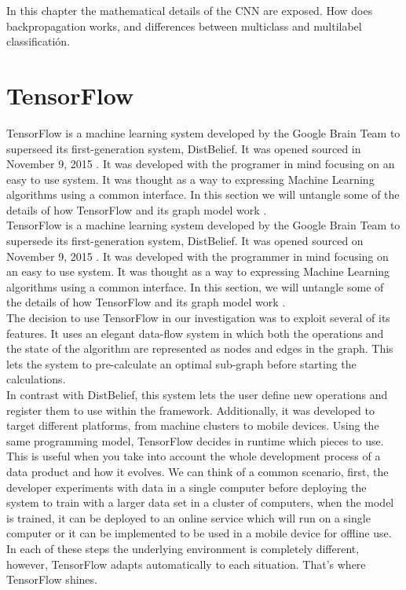 In this chapter the mathematical details of the CNN are exposed. How does backpropagation works, and differences between multiclass and multilabel classificatión.

\section{TensorFlow}

TensorFlow is a machine learning system developed by the Google Brain Team to superseed its first-generation system, DistBelief. It was opened sourced in November 9, 2015 . It was developed with the programer in mind focusing on an easy to use system. It was thought as a way to expressing Machine Learning algorithms using a common interface. In this section we will untangle some of the details of how TensorFlow and its graph model work \cite{DBLP:journals/corr/AbadiBCCDDDGIIK16}.\\

TensorFlow is a machine learning system developed by the Google Brain Team to supersede its first-generation system, DistBelief. It was opened sourced on November 9, 2015 \cite{tensorflow2015-whitepaper}. It was developed with the programmer in mind focusing on an easy to use system. It was thought as a way to expressing Machine Learning algorithms using a common interface. In this section, we will untangle some of the details of how TensorFlow and its graph model work \cite{DBLP:journals/corr/AbadiBCCDDDGIIK16}.\\

The decision to use TensorFlow in our investigation was to exploit several of its features. It uses an elegant data-flow system in which both the operations and the state of the algorithm are represented as nodes and edges in the graph. This lets the system to pre-calculate an optimal sub-graph before starting the calculations.\\

In contrast with DistBelief, this system lets the user define new operations and register them to use within the framework. Additionally, it was developed to target different platforms, from machine clusters to mobile devices. Using the same programming model, TensorFlow decides in runtime which pieces to use. This is useful when you take into account the whole development process of a data product and how it evolves. We can think of a common scenario, first, the developer experiments with data in a single computer before deploying the system to train with a larger data set in a cluster of computers, when the model is trained, it can be deployed to an online service which will run on a single computer or it can be implemented to be used in a mobile device for offline use. In each of these steps the underlying environment is completely different, however, TensorFlow adapts automatically to each situation. That's where TensorFlow shines.\\



